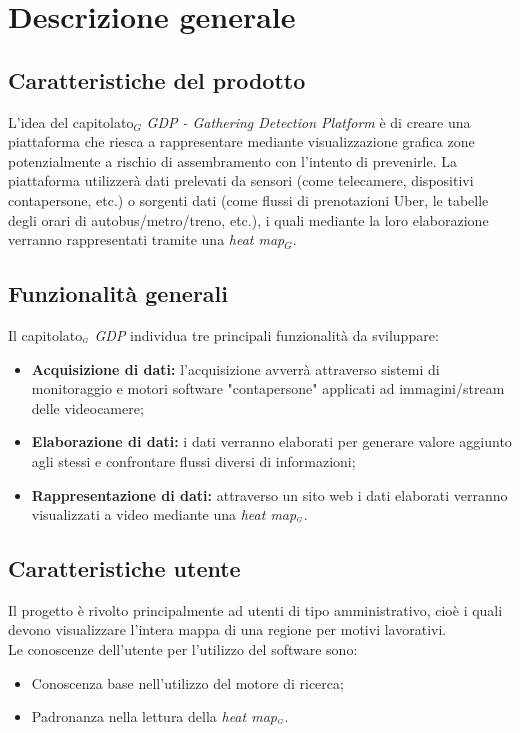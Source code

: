 \chapter{Descrizione generale}\label{descrizioneGenerale}
\section{Caratteristiche del prodotto}\label{descrizioneGeneraleCaratteristicheProdotto}
L'idea del capitolato$_G$ \textit{GDP - Gathering Detection Platform} è di creare una piattaforma che riesca a rappresentare mediante visualizzazione grafica zone potenzialmente a rischio di assembramento con l'intento di prevenirle.
La piattaforma utilizzerà dati prelevati da sensori (come telecamere, dispositivi contapersone, etc.) o sorgenti dati (come flussi di prenotazioni Uber, le tabelle degli orari di autobus/metro/treno, etc.), i quali mediante la loro elaborazione verranno rappresentati tramite una \textit{heat map$_G$}.

\section{Funzionalità generali}\label{descrizioneGeneraleFunzionalitàGenerali}
Il capitolato$_{\scaleto{G}{3pt}}$ \textit{GDP} individua tre principali funzionalità da sviluppare:
\begin{itemize}
	\item \textbf{Acquisizione di dati:} l'acquisizione avverrà attraverso sistemi di monitoraggio e motori software "contapersone" applicati ad immagini/stream delle videocamere;
	\item \textbf{Elaborazione di dati:} i dati verranno elaborati per generare valore aggiunto agli stessi e confrontare flussi diversi di informazioni;
	\item \textbf{Rappresentazione di dati:} attraverso un sito web i dati elaborati verranno visualizzati a video mediante una \textit{heat map$_{\scaleto{G}{3pt}}$}.
\end{itemize}

\section{Caratteristiche utente}\label{descrizioneGeneraleCaratteristicheUtente}
Il progetto è rivolto principalmente ad utenti di tipo amministrativo, cioè i quali devono visualizzare l'intera mappa di una regione per motivi lavorativi. \\
Le conoscenze dell'utente per l'utilizzo del software sono:
\begin{itemize}
	\item Conoscenza base nell'utilizzo del motore di ricerca;
	\item Padronanza nella lettura della \textit{heat map$_{\scaleto{G}{3pt}}$}.
\end{itemize}

